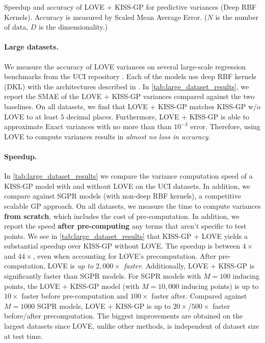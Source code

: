 \begin{table}[t!]
  \caption[Speedup and accuracy of LOVE + KISS-GP{} for predictive variances.]{
    Speedup and accuracy of LOVE + KISS-GP{} for predictive variances (Deep RBF Kernels).
    Accuracy is measured by Scaled Mean Average Error.
    ($N$ is the number of data, $D$ is the dimensionality.)
    \label{tab:large_dataset_results}
  }
  \vspace{0.5ex}
  \centering
  \resizebox{\textwidth}{!}{%
    
  }
  \vspace{1em}

  \resizebox{\textwidth}{!}{%
    
  }
\end{table}

\paragraph{Large datasets.}
We measure the accuracy of LOVE{} variances on several large-scale regression benchmarks from the UCI repository \cite{asuncion2007uci}.
Each of the models use deep RBF kernels (DKL) with the architectures described in \cite{wilson2016deep}.
In \cref{tab:large_dataset_results}, we report the SMAE of the LOVE + KISS-GP{} variances compared against the two baselines.
On all datasets, we find that LOVE{} + KISS-GP matches KISS-GP w/o LOVE{} to at least $5$ decimal places.
Furthermore, LOVE + KISS-GP{} is able to approximate Exact variances with no more than than $10^{-3}$ error.
Therefore, using LOVE{} to compute variances results in \emph{almost no loss in accuracy}.

\paragraph{Speedup.}
In \cref{tab:large_dataset_results} we compare the variance computation speed of a KISS-GP model with and without LOVE{} on the UCI datasets.
In addition, we compare against SGPR models (with non-deep RBF kernels), a competitive scalable GP approach.
On all datasets, we measure the time to compute variances {\bf from scratch}, which includes the cost of pre-computation.
In addition, we report the speed {\bf after pre-computing} any terms that aren't specific to test points.
We see in \cref{tab:large_dataset_results} that KISS-GP + LOVE{} yields a substantial speedup over KISS-GP without LOVE{}.
The speedup is between $4\times$ and $44\times$, even when accounting for LOVE{}'s precomputation.
After pre-computation, LOVE{} is \emph{up to $2,\!000\times$ faster}.
Additionally, LOVE + KISS-GP{} is significantly faster than SGPR models.
For SGPR models with $M=100$ inducing points, the LOVE + KISS-GP{} model (with $M=10,\!000$ inducing points) is up to $10\times$ faster before pre-computation and $100\times$ faster after.
Compared against $M=1000$ SGPR models, LOVE + KISS-GP{} is up to $20\times$/$500\times$ faster before/after precomputation.
The biggest improvements are obtained on the largest datasets since LOVE{}, unlike other methods, is independent of dataset size at test time.

